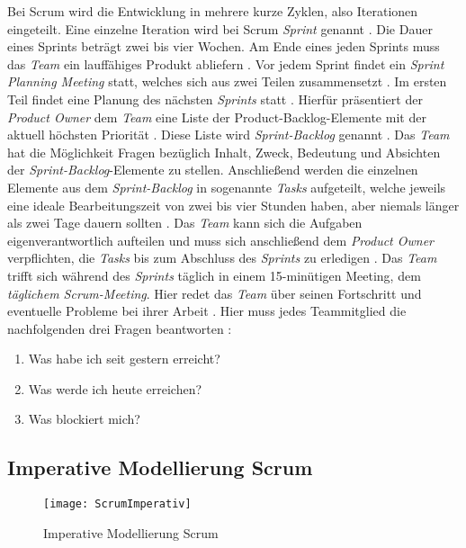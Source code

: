 Bei Scrum wird die Entwicklung in mehrere kurze Zyklen, also Iterationen eingeteilt. Eine einzelne Iteration wird bei Scrum \textit{Sprint} genannt \cite{Henning2011}. Die Dauer eines Sprints beträgt zwei bis vier Wochen. Am Ende eines jeden Sprints muss das \textit{Team} ein lauffähiges Produkt abliefern \cite{Wolf2011}. Vor jedem Sprint findet ein \textit{Sprint Planning Meeting} statt, welches sich aus zwei Teilen zusammensetzt \cite{Pichler2010}. Im ersten Teil findet eine Planung des nächsten \textit{Sprints} statt \cite{Lacey2012}. Hierfür präsentiert der \textit{Product Owner} dem \textit{Team} eine Liste der Product-Backlog-Elemente mit der aktuell höchsten Priorität \cite{Schwaber2004, Schwaber2007,Pichler2010}. Diese Liste wird \textit{Sprint-Backlog} genannt \cite{Wolf2011}. Das \textit{Team} hat die Möglichkeit Fragen bezüglich Inhalt, Zweck, Bedeutung und Absichten der \textit{Sprint-Backlog}-Elemente zu stellen. Anschließend werden die einzelnen Elemente aus dem \textit{Sprint-Backlog} in sogenannte \textit{Tasks} aufgeteilt, welche jeweils eine ideale Bearbeitungszeit von zwei bis vier Stunden haben, aber niemals länger als zwei Tage dauern sollten \cite{Wolf2011}. Das \textit{Team} kann sich die Aufgaben eigenverantwortlich aufteilen und muss sich anschließend dem \textit{Product  Owner} verpflichten, die \textit{Tasks} bis zum Abschluss des \textit{Sprints} zu erledigen \cite{Wolf2011, Keith2010,Pichler2010}.
Das  \textit{Team} trifft sich während des \textit{Sprints} täglich in einem 15-minütigen Meeting, dem \textit{täglichem Scrum-Meeting}. Hier redet das \textit{Team} über seinen Fortschritt und eventuelle Probleme bei ihrer Arbeit \cite{Keith2010}. Hier muss jedes Teammitglied die nachfolgenden drei Fragen beantworten       \cite{Wolf2011}:
   \begin{enumerate}
      \item Was habe ich seit gestern erreicht?
      \item Was werde ich heute erreichen?
      \item Was blockiert mich?
      \end {enumerate}
      
\subsection{Imperative Modellierung Scrum}

\begin{figure}[htp]
\begin{center}
  \texttt{[image: ScrumImperativ]} %
  \caption{Imperative Modellierung Scrum}
  \label{fig:ScrumImperativ}
\end{center}
\end{figure}

